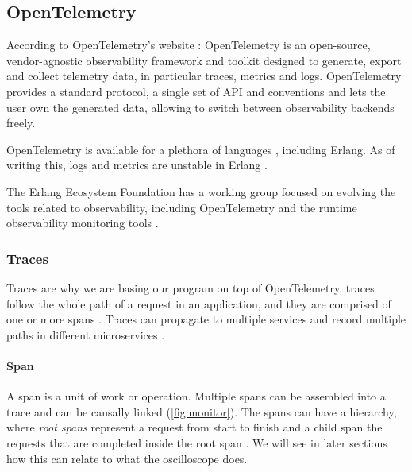 \subsection{OpenTelemetry}
    According to OpenTelemetry's website \cite{otel-o}: OpenTelemetry is an open-source, vendor-agnostic observability framework and toolkit designed to generate, export and collect telemetry data, in particular traces, metrics and logs. OpenTelemetry provides a standard protocol, a single set of API and conventions and lets the user own the generated data, allowing to switch between observability backends freely.
   
   OpenTelemetry is available for a plethora of languages \cite{otel-lang}, including Erlang. As of writing this, logs and metrics are unstable in Erlang \cite{otel-in}.
     
    The Erlang Ecosystem Foundation has a working group focused on evolving the tools related to observability, including OpenTelemetry and the runtime observability monitoring tools \cite{obs-group}. 
    
    \subsubsection{Traces}
        Traces are why we are basing our program on top of OpenTelemetry, traces follow the whole path of a request in an application, and they are comprised of one or more spans \cite{otel-t}. Traces can propagate to multiple services and record multiple paths in different microservices \cite{otel-dt}. 
        
        \paragraph{Span} A span is a unit of work or operation. Multiple spans can be assembled into a trace and can be causally linked (\cref{fig:monitor}). The spans can have a hierarchy, where \textit{root spans} represent a request from start to finish and a child span the requests that are completed inside the root span \cite{otel-dt}. We will see in later sections how this can relate to what the oscilloscope does.

